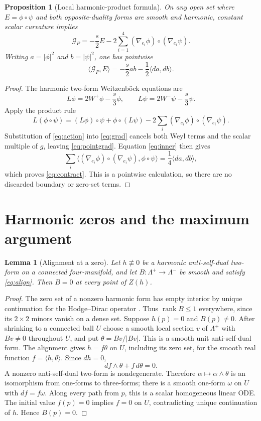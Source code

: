 \documentclass[11pt,a4paper]{article}
\newtheorem{lemma}[theorem]{Lemma}
\newtheorem{proposition}[theorem]{Proposition}
\theoremstyle{remark}\newtheorem{remark}[theorem]{Remark}
\newcommand{\GP}{\mathcal G_P}
\newcommand{\ip}[2]{\langle #1,#2\rangle}
\numberwithin{equation}{section}
\begin{document}
\begin{proposition}[Local harmonic-product formula]\label{prop:local}
On any open set where $E=\phi\circ\psi$ and both opposite-duality forms
are smooth and harmonic, constant scalar curvature implies
\begin{equation}\label{eq:pointgrad}
 \boxed{\GP=-\frac{s}{2}E-
 2\sum_{i=1}^4(\nabla_{e_i}\phi)\circ(\nabla_{e_i}\psi).}
\end{equation}
Writing $a=|\phi|^2$ and $b=|\psi|^2$, one has pointwise
\begin{equation}\label{eq:contract}
 \boxed{\ip{\GP}{E}=-\frac{s}{2}ab-\frac12\ip{da}{db}.}
\end{equation}
\end{proposition}
\begin{proof}
The harmonic two-form Weitzenb\"ock equations are
\[
 L\phi=2W^+\phi-\frac{s}{3}\phi,\qquad
 L\psi=2W^-\psi-\frac{s}{3}\psi.
\]
Apply the product rule
\[
 L(\phi\circ\psi)=(L\phi)\circ\psi+\phi\circ(L\psi)
 -2\sum_i(\nabla_{e_i}\phi)\circ(\nabla_{e_i}\psi).
\]
Substitution of \eqref{eq:action} into \eqref{eq:grad} cancels both Weyl
terms and the scalar multiple of $g$, leaving \eqref{eq:pointgrad}.
Equation \eqref{eq:inner} then gives
\[
 \sum_i\ip{(\nabla_{e_i}\phi)\circ(\nabla_{e_i}\psi)}{\phi\circ\psi}
 =\frac14\ip{da}{db},
\]
which proves \eqref{eq:contract}. This is a pointwise calculation, so there
are no discarded boundary or zero-set terms.
\end{proof}

\section{Harmonic zeros and the maximum argument}

\begin{lemma}[Alignment at a zero]\label{lem:zeros}
Let $h\not\equiv0$ be a harmonic anti-self-dual two-form on a connected
four-manifold, and let $B:\Lambda^+\to\Lambda^-$ be smooth and satisfy
\eqref{eq:align}. Then $B=0$ at every point of $Z(h)$.
\end{lemma}
\begin{proof}
The zero set of a nonzero harmonic form has empty interior by unique
continuation for the Hodge--Dirac operator \cite{Baer}. Thus $\operatorname{rank}B\le1$
everywhere, since its $2\times2$ minors vanish on a dense set.
Suppose $h(p)=0$ and $B(p)\ne0$. After shrinking to a connected ball $U$
choose a smooth local section $v$ of $\Lambda^+$ with $Bv\ne0$ throughout
$U$, and put $\theta=Bv/|Bv|$. This is a smooth unit anti-self-dual form.
The alignment gives $h=f\theta$ on $U$, including its zero set, for the
smooth real function $f=\ip{h}{\theta}$.
Since $dh=0$,
\[
 df\wedge\theta+f\,d\theta=0.
\]
A nonzero anti-self-dual two-form is nondegenerate. Therefore
$\alpha\mapsto\alpha\wedge\theta$ is an isomorphism from one-forms to
three-forms; there is a smooth one-form $\omega$ on $U$ with $df=f\omega$.
Along every path from $p$, this is a scalar homogeneous linear ODE.
The initial value $f(p)=0$ implies $f=0$ on $U$, contradicting unique
continuation of $h$. Hence $B(p)=0$.
\end{proof}
\end{document}
